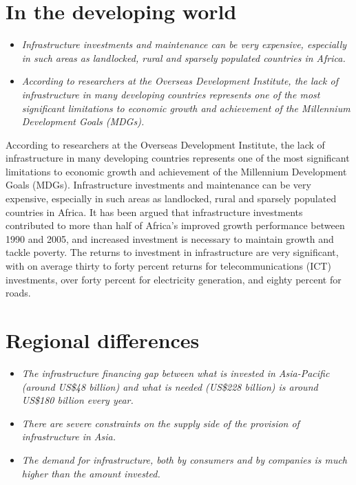 \section{In the developing world}\label{in-the-developing-world}

\begin{itemize}
\item
  \emph{Infrastructure investments and maintenance can be very
  expensive, especially in such areas as landlocked, rural and sparsely
  populated countries in Africa.}
\item
  \emph{According to researchers at the Overseas Development Institute,
  the lack of infrastructure in many developing countries represents one
  of the most significant limitations to economic growth and achievement
  of the Millennium Development Goals (MDGs).}
\end{itemize}

According to researchers at the Overseas Development Institute, the lack
of infrastructure in many developing countries represents one of the
most significant limitations to economic growth and achievement of the
Millennium Development Goals (MDGs). Infrastructure investments and
maintenance can be very expensive, especially in such areas as
landlocked, rural and sparsely populated countries in Africa. It has
been argued that infrastructure investments contributed to more than
half of Africa's improved growth performance between 1990 and 2005, and
increased investment is necessary to maintain growth and tackle poverty.
The returns to investment in infrastructure are very significant, with
on average thirty to forty percent returns for telecommunications (ICT)
investments, over forty percent for electricity generation, and eighty
percent for roads.

\section{Regional differences}\label{regional-differences}

\begin{itemize}
\item
  \emph{The infrastructure financing gap between what is invested in
  Asia-Pacific (around US\$48 billion) and what is needed (US\$228
  billion) is around US\$180 billion every year.}
\item
  \emph{There are severe constraints on the supply side of the provision
  of infrastructure in Asia.}
\item
  \emph{The demand for infrastructure, both by consumers and by
  companies is much higher than the amount invested.}
\end{itemize}

